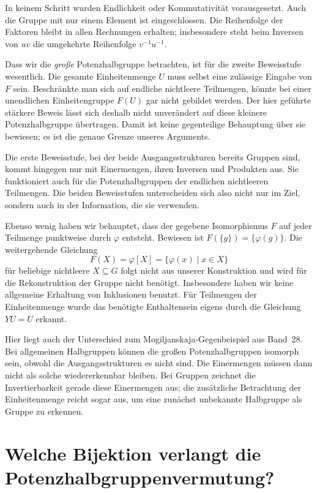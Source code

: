 In keinem Schritt wurden Endlichkeit oder Kommutativität
vorausgesetzt. Auch die Gruppe mit nur einem Element ist
eingeschlossen. Die Reihenfolge der Faktoren bleibt in allen
Rechnungen erhalten; insbesondere steht beim Inversen von
\(uv\) die umgekehrte Reihenfolge \(v^{-1}u^{-1}\).

Dass wir die \emph{große} Potenzhalbgruppe betrachten, ist
für die zweite Beweisstufe wesentlich. Die gesamte
Einheitenmenge \(U\) muss selbst eine zulässige Eingabe von
\(F\) sein. Beschränkte man sich auf endliche nichtleere
Teilmengen, könnte bei einer unendlichen Einheitengruppe
\(F(U)\) gar nicht gebildet werden. Der hier geführte
stärkere Beweis lässt sich deshalb nicht unverändert auf
diese kleinere Potenzhalbgruppe übertragen. Damit ist keine
gegenteilige Behauptung über sie bewiesen; es ist die genaue
Grenze unseres Arguments.

Die erste Beweisstufe, bei der beide Ausgangsstrukturen
bereits Gruppen sind, kommt hingegen nur mit Einermengen,
ihren Inversen und Produkten aus. Sie funktioniert auch
für die Potenzhalbgruppen der endlichen nichtleeren
Teilmengen. Die beiden Beweisstufen unterscheiden sich
also nicht nur im Ziel, sondern auch in der Information,
die sie verwenden.

Ebenso wenig haben wir behauptet, dass der gegebene
Isomorphismus \(F\) auf jeder Teilmenge punktweise durch
\(\varphi\) entsteht. Bewiesen ist
\(F(\{g\})=\{\varphi(g)\}\). Die weitergehende Gleichung
\[
  F(X)=\varphi[X]
       =\{\varphi(x)\mid x\in X\}
\]
für beliebige nichtleere \(X\subseteq G\) folgt nicht aus
unserer Konstruktion und wird für die Rekonstruktion der
Gruppe nicht benötigt. Insbesondere haben wir keine
allgemeine Erhaltung von Inklusionen benutzt. Für Teilmengen
der Einheitenmenge wurde das benötigte Enthaltensein eigens
durch die Gleichung \(YU=U\) erkannt.

Hier liegt auch der Unterschied zum Mogiljanskaja-Gegenbeispiel
aus Band~28. Bei allgemeinen Halbgruppen können die großen
Potenzhalbgruppen isomorph sein, obwohl die Ausgangsstrukturen
es nicht sind. Die Einermengen müssen dann nicht als solche
wiedererkennbar bleiben. Bei Gruppen zeichnet die
Invertierbarkeit gerade diese Einermengen aus; die zusätzliche
Betrachtung der Einheitenmenge reicht sogar aus, um eine
zunächst unbekannte Halbgruppe als Gruppe zu erkennen.

\clearpage
\section*{Welche Bijektion verlangt die Potenzhalbgruppenvermutung?}
\hypertarget{reconstruction.reading.conjecture}{}

